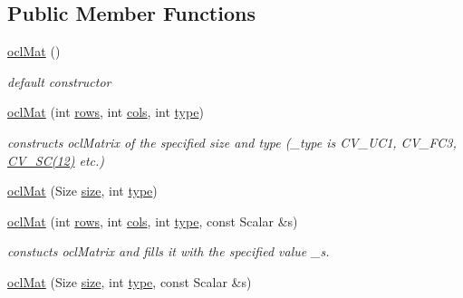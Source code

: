 \subsection*{Public Member Functions}
\begin{DoxyCompactItemize}
\item 
\hyperlink{classcv_1_1ocl_1_1oclMat_a1012cff89dfdfd53468b97ead16e8999}{ocl\-Mat} ()
\begin{DoxyCompactList}\small\item\em default constructor \end{DoxyCompactList}\item 
\hyperlink{classcv_1_1ocl_1_1oclMat_a2a5dbcff1873222278f6669caa969186}{ocl\-Mat} (int \hyperlink{classcv_1_1ocl_1_1oclMat_a1ccf0125fff51e419aa89b144ed511be}{rows}, int \hyperlink{classcv_1_1ocl_1_1oclMat_ac814acb1fd2613d43e5fbb9c2166ac9f}{cols}, int \hyperlink{classcv_1_1ocl_1_1oclMat_acf6fe0735d1dac151e2c301f01470827}{type})
\begin{DoxyCompactList}\small\item\em constructs ocl\-Matrix of the specified size and type (\-\_\-type is C\-V\-\_\-U\-C1, C\-V\-\_\-F\-C3, \hyperlink{core_2types__c_8h_ae9e13c89621697e73aea4636da5674ff}{C\-V\-\_\-S\-C(12)} etc.) \end{DoxyCompactList}\item 
\hyperlink{classcv_1_1ocl_1_1oclMat_aef9ee851fbba441e651fbac5774b4137}{ocl\-Mat} (Size \hyperlink{classcv_1_1ocl_1_1oclMat_a21384709f0d43efd26d0c70edc7adf8a}{size}, int \hyperlink{classcv_1_1ocl_1_1oclMat_acf6fe0735d1dac151e2c301f01470827}{type})
\item 
\hyperlink{classcv_1_1ocl_1_1oclMat_acf653026d1156b8b11c1e319dc9e0c70}{ocl\-Mat} (int \hyperlink{classcv_1_1ocl_1_1oclMat_a1ccf0125fff51e419aa89b144ed511be}{rows}, int \hyperlink{classcv_1_1ocl_1_1oclMat_ac814acb1fd2613d43e5fbb9c2166ac9f}{cols}, int \hyperlink{classcv_1_1ocl_1_1oclMat_acf6fe0735d1dac151e2c301f01470827}{type}, const Scalar \&s)
\begin{DoxyCompactList}\small\item\em constucts ocl\-Matrix and fills it with the specified value \-\_\-s. \end{DoxyCompactList}\item 
\hyperlink{classcv_1_1ocl_1_1oclMat_a1647b7a81a85de433adc4d1c0dc44934}{ocl\-Mat} (Size \hyperlink{classcv_1_1ocl_1_1oclMat_a21384709f0d43efd26d0c70edc7adf8a}{size}, int \hyperlink{classcv_1_1ocl_1_1oclMat_acf6fe0735d1dac151e2c301f01470827}{type}, const Scalar \&s)

\end{DoxyCompactItemize}
